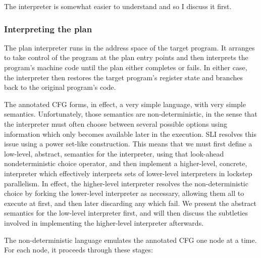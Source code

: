 The interpreter is somewhat easier to understand and so I discuss it first.

\subsubsection{Interpreting the plan}

The plan interpreter runs in the address space of the target program.
It arranges to take control of the program at the plan entry points and then interprets the program's machine code until the plan either completes or fails.
In either case, the interpreter then restores the target program's register state and branches back to the original program's code.


The annotated CFG forms, in effect, a very simple language, with very simple semantics.
Unfortunately, those semantics are non-deterministic, in the sense that the interpreter must often choose between several possible options using information which only becomes available later in the execution.
SLI resolves this issue using a power set-like construction.
This means that we must first define a low-level, abstract, semantics for the interpreter, using that look-ahead nondeterministic choice operator, and then implement a higher-level, concrete, interpreter which effectively interprets sets of lower-level interpreters in lockstep parallelism.
In effect, the higher-level interpreter resolves the non-deterministic choice by forking the lower-level interpreter as necessary, allowing them all to execute at first, and then later discarding any which fail.
We present the abstract semantics for the low-level interpreter first, and will then discuss the subtleties involved in implementing the higher-level interpreter afterwards.

The non-deterministic language emulates the annotated CFG one node at a time.
For each node, it proceeds through these stages:

